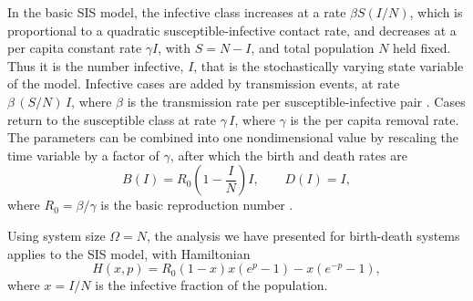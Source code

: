 \documentclass[review]{elsarticle}
\newcommand\commentout[1]{}
\begin{document}
In the basic SIS model, the infective class increases at a rate
$\beta S (I / N)$, which is proportional to a quadratic susceptible-infective contact rate,
and decreases at a per capita constant rate $\gamma I$,
with $S=N-I$, and total population $N$ held fixed. 
Thus it is the number infective, $I$, that
is the stochastically varying state variable of the model.
Infective cases are added by transmission events, at rate
$\beta\,(S/N)\,I$, where
$\beta$ is the transmission rate per susceptible-infective pair
\cite{bailey1975}.
Cases return to the susceptible class at rate $\gamma\,I$,
where $\gamma$ is the per capita removal rate.
The parameters can be combined into one nondimensional value by
rescaling the time variable by a factor of $\gamma$,
after which the birth and death rates are
\[  B(I) = R_0 \left(1-\frac{I}N\right) I, \qquad D(I) = I,  \]
where $R_0=\beta/\gamma$ is the basic reproduction number
\cite{hethcote2000mathematics}.

\commentout{
The primary line of inquiry into the quasistationary behavior
of this model begins with Cavender's \cite{cavender_quasi-stationary_1978}
construction of the stationary distribution of a closely-related process,
a modification of the SIS process in which the rate of transition from one
infective individual to none is set to zero.  The stationary distribution
$\mathbf{p}^{(0)}$ of this process is used as an approximation to the
quasistationary distribution of the SIS model. That approximation is
commonly studied together with the one introduced by Kryscio and
Lef\`evre \cite{kryscio_extinction_1989}, which takes the stationary
distribution $\mathbf{p}^{(1)}$ of the SIS process
modified by introducing one permanently
infective individual as an approximation to $\mathbf{q}$.
More recently, N{\aa}sell has defined a ``uniform approximation'', constructed
by applying an iterated contracting map to the starting vectors
$\mathbf{p}^{(0)}$ and $\mathbf{p}^{(1)}$, which approximates the true
quasistationary solution quite well in the body and left tail of the
distribution \cite{nasell_extinction_2007,nasell_extinction_2011}.
Many of the other approaches discussed in our introduction have also
been applied to the SIS model.
}

Using system size $\Omega=N$, the analysis we have presented for
birth-death systems applies to the SIS model, with Hamiltonian 
\begin{dmath*}
  H(x,p) = R_0 (1-x) x \left( e^p - 1 \right) - x \left( e^{-p} - 1 \right),
\end{dmath*}
where $x=I/N$ is the infective fraction of the population.
\end{document}

